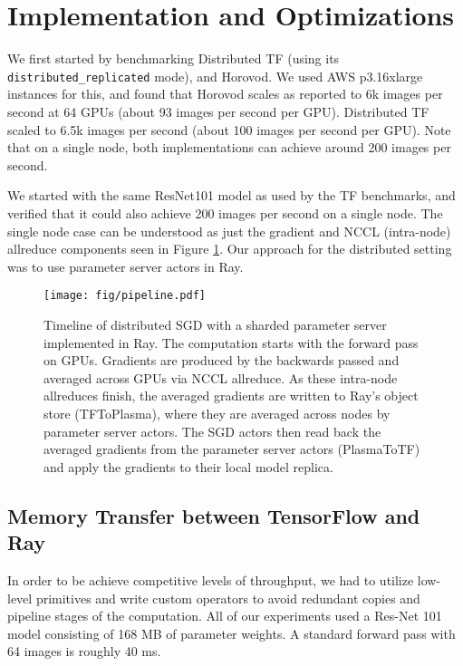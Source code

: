 \section{Implementation and Optimizations}
We first started by benchmarking Distributed TF (using its \texttt{distributed\_replicated} mode), and Horovod. We used AWS p3.16xlarge instances for this, and found that Horovod scales as reported to 6k images per second at 64 GPUs (about 93 images per second per GPU). Distributed TF scaled to 6.5k images per second (about 100 images per second per GPU). Note that on a single node, both implementations can achieve around 200 images per second.

We started with the same ResNet101 model as used by the TF benchmarks, and verified that it could also achieve 200 images per second on a single node. The single node case can be understood as just the gradient and NCCL (intra-node) allreduce components seen in Figure \ref{fig:pipeline}. Our approach for the distributed setting was to use parameter server actors in Ray.

\begin{figure}
    \centering
    \texttt{[image: fig/pipeline.pdf]}
    \caption{
    \small{
        Timeline of distributed SGD with a sharded parameter server implemented in Ray. The computation starts with the forward pass on GPUs. Gradients are produced by the backwards passed and averaged across GPUs via NCCL allreduce. As these intra-node allreduces finish, the averaged gradients are written to Ray's object store (TFToPlasma), where they are averaged across nodes by parameter server actors. The SGD actors then read back the averaged gradients from the parameter server actors (PlasmaToTF) and apply the gradients to their local model replica.
    }
    }
    \label{fig:pipeline}
\end{figure}

\subsection{Memory Transfer between TensorFlow and Ray}

In order to be achieve competitive levels of throughput, we had to utilize low-level primitives and write custom operators to avoid redundant copies and pipeline stages of the computation. All of our experiments used a Res-Net 101 model consisting of 168 MB of parameter weights. A standard forward pass with 64 images is roughly 40 ms.

